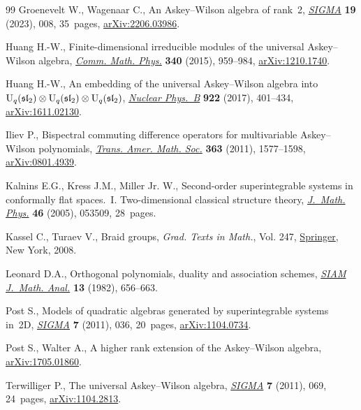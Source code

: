 \begin{thebibliography}{99}
Groenevelt W., Wagenaar C., An {A}skey--{W}ilson algebra of rank~2,
 \href{https://doi.org/10.3842/SIGMA.2023.008}{\textit{SIGMA}} \textbf{19} (2023), 008, 35~pages, \href{https://arxiv.org/abs/2206.03986}{arXiv:2206.03986}.

Huang H.-W., Finite-dimensional irreducible modules of the universal
 {A}skey--{W}ilson algebra, \href{https://doi.org/10.1007/s00220-015-2467-9}{\textit{Comm. Math. Phys.}} \textbf{340} (2015),
 959--984, \href{https://arxiv.org/abs/1210.1740}{arXiv:1210.1740}.

Huang H.-W., An embedding of the universal {A}skey--{W}ilson algebra into
 {${\rm U}_q(\mathfrak{sl}_2)\otimes {\rm U}_q(\mathfrak{sl}_2)\otimes
 {\rm U}_q(\mathfrak{sl}_2)$}, \href{https://doi.org/10.1016/j.nuclphysb.2017.07.007}{\textit{Nuclear Phys.~B}} \textbf{922} (2017),
 401--434, \href{https://arxiv.org/abs/1611.02130}{arXiv:1611.02130}.

Iliev P., Bispectral commuting difference operators for multivariable
 {A}skey--{W}ilson polynomials, \href{https://doi.org/10.1090/S0002-9947-2010-05183-9}{\textit{Trans. Amer. Math. Soc.}} \textbf{363}
 (2011), 1577--1598, \href{https://arxiv.org/abs/0801.4939}{arXiv:0801.4939}.

Kalnins E.G., Kress J.M., Miller Jr. W., Second-order superintegrable systems
 in conformally flat spaces.~{I}. {T}wo-dimensional classical structure
 theory, \href{https://doi.org/10.1063/1.1897183}{\textit{J.~Math. Phys.}} \textbf{46} (2005), 053509, 28~pages.

Kassel C., Turaev V., Braid groups, \textit{Grad. Texts in Math.}, Vol. 247,
 \href{https://doi.org/10.1007/978-0-387-68548-9}{Springer}, New York, 2008.

Leonard D.A., Orthogonal polynomials, duality and association schemes,
 \href{https://doi.org/10.1137/0513044}{\textit{SIAM J.~Math. Anal.}} \textbf{13} (1982), 656--663.

Post S., Models of quadratic algebras generated by superintegrable systems
 in~2{D}, \href{https://doi.org/10.3842/SIGMA.2011.036}{\textit{SIGMA}} \textbf{7} (2011), 036, 20~pages, \href{https://arxiv.org/abs/#2}{arXiv:1104.0734}.

Post S., Walter A., A higher rank extension of the {A}skey--{W}ilson algebra,
 \href{https://arxiv.org/abs/1705.01860}{arXiv:1705.01860}.

Terwilliger P., The universal {A}skey--{W}ilson algebra, \href{https://doi.org/10.3842/SIGMA.2011.069}{\textit{SIGMA}}
 \textbf{7} (2011), 069, 24~pages, \href{https://arxiv.org/abs/1104.2813}{arXiv:1104.2813}.


\end{thebibliography}
